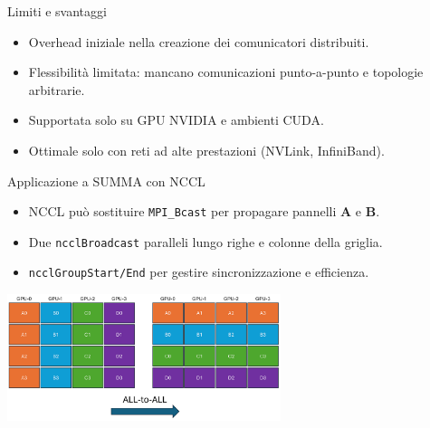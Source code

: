 \begin{frame}{Limiti e svantaggi}
    \begin{itemize}
        \item Overhead iniziale nella creazione dei comunicatori distribuiti.
        \item Flessibilità limitata: mancano comunicazioni punto-a-punto e topologie arbitrarie.
        \item Supportata solo su GPU NVIDIA e ambienti CUDA.
        \item Ottimale solo con reti ad alte prestazioni (NVLink, InfiniBand).
    \end{itemize}
\end{frame}

\begin{frame}{Applicazione a SUMMA con NCCL}
    \begin{itemize}
        \item NCCL può sostituire \texttt{MPI\_Bcast} per propagare pannelli $\mathbf{A}$ e $\mathbf{B}$.
        \item Due \texttt{ncclBroadcast} paralleli lungo righe e colonne della griglia.
        \item \texttt{ncclGroupStart/End} per gestire sincronizzazione e efficienza.
    \end{itemize}

    \includegraphics[width=0.6\textwidth]{imgs/summa_nccl.png}
\end{frame}